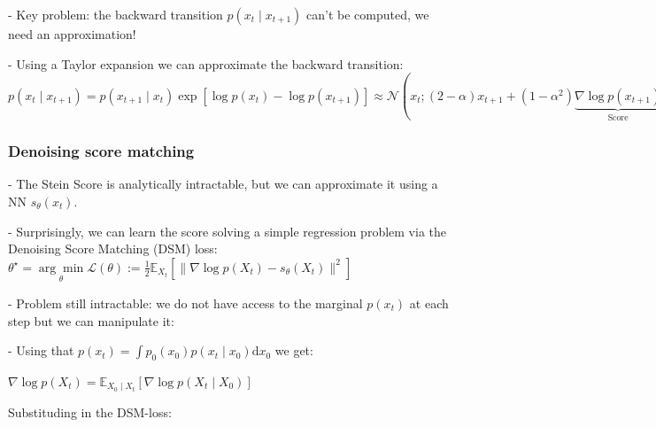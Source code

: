 - Key problem: the backward transition $p(x_{t} \mid x_{t+1})$ can't be computed, we need an approximation!

- Using a Taylor expansion we can approximate the backward transition:
$p(x_{t} \mid x_{t+1})=p(x_{t+1} \mid x_{t}) \exp [\log p(x_{t})-\log p(x_{t+1})] \approx \mathcal{N}(x_{t} ;(2-\alpha) x_{t+1}+(1-\alpha^{2}) \underbrace{\nabla \log p(x_{t+1})}_{\text{Score}},(1-\alpha^{2}) \mathbb{I}_{d})$


\subsubsection*{Denoising score matching}
- The Stein Score is analytically intractable, but we can approximate it using a NN $s_{\theta}(x_{t})$. 

- Surprisingly, we can learn the score solving a simple regression problem via the Denoising Score Matching (DSM) loss:
$\theta^{\star}=\underset{\theta}{\arg \min } \mathcal{L}(\theta):=\frac{1}{2} \mathbb{E}_{X_{t}}[\|\nabla \log p(X_{t})-s_{\theta}(X_{t})\|^2]$


- Problem still intractable: we do not have access to the marginal $p(x_{t})$ at each step but we can manipulate it:




- Using that $p(x_{t})=\int p_{0}(x_{0}) p(x_{t} \mid x_{0}) \mathrm{d} x_{0}$ we get:

$
\nabla \log p(X_{t})=\mathbb{E}_{X_{0} \mid X_{t}}[\nabla \log p(X_{t} \mid X_{0})]
$

Substituding in the DSM-loss:

